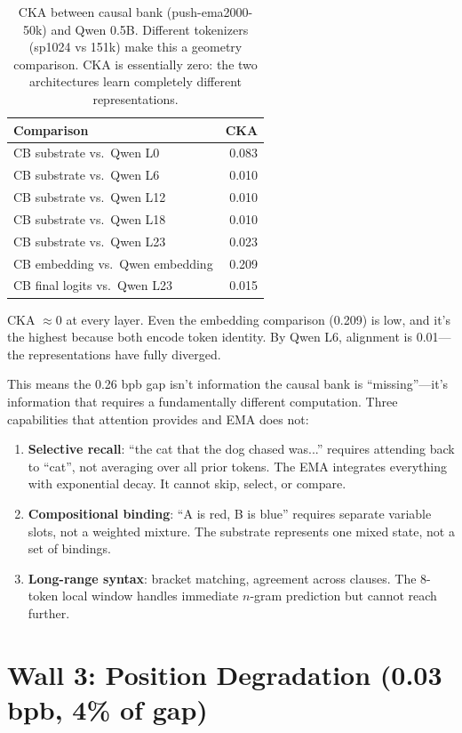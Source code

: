 \documentclass[11pt,a4paper]{report}
\begin{document}
\begin{table}[h]
\centering
\begin{tabular}{lr}
\toprule
\textbf{Comparison} & \textbf{CKA} \\
\midrule
CB substrate vs.\ Qwen L0 & 0.083 \\
CB substrate vs.\ Qwen L6 & 0.010 \\
CB substrate vs.\ Qwen L12 & 0.010 \\
CB substrate vs.\ Qwen L18 & 0.010 \\
CB substrate vs.\ Qwen L23 & 0.023 \\
CB embedding vs.\ Qwen embedding & 0.209 \\
CB final logits vs.\ Qwen L23 & 0.015 \\
\bottomrule
\end{tabular}
\caption{CKA between causal bank (push-ema2000-50k) and Qwen 0.5B. Different tokenizers (sp1024 vs 151k) make this a geometry comparison. CKA is essentially zero: the two architectures learn completely different representations.}
\label{tab:cka}
\end{table}

CKA $\approx 0$ at every layer. Even the embedding comparison (0.209) is low, and it's the highest because both encode token identity. By Qwen L6, alignment is 0.01---the representations have fully diverged.

This means the 0.26 bpb gap isn't information the causal bank is ``missing''---it's information that requires a fundamentally different computation. Three capabilities that attention provides and EMA does not:

\begin{enumerate}
\item \textbf{Selective recall}: ``the cat that the dog chased was...'' requires attending back to ``cat'', not averaging over all prior tokens. The EMA integrates everything with exponential decay. It cannot skip, select, or compare.
\item \textbf{Compositional binding}: ``A is red, B is blue'' requires separate variable slots, not a weighted mixture. The substrate represents one mixed state, not a set of bindings.
\item \textbf{Long-range syntax}: bracket matching, agreement across clauses. The 8-token local window handles immediate $n$-gram prediction but cannot reach further.
\end{enumerate}


\section{Wall 3: Position Degradation (0.03 bpb, 4\% of gap)}
\end{document}
